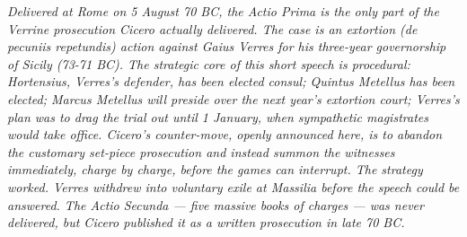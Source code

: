 
\textit{Delivered at Rome on 5 August 70 BC, the Actio Prima is the only
part of the Verrine prosecution Cicero actually delivered. The case is
an extortion (de pecuniis repetundis) action against Gaius Verres for
his three-year governorship of Sicily (73-71 BC). The strategic core of
this short speech is procedural: Hortensius, Verres's defender, has
been elected consul; Quintus Metellus has been elected; Marcus Metellus
will preside over the next year's extortion court; Verres's plan was
to drag the trial out until 1 January, when sympathetic magistrates
would take office. Cicero's counter-move, openly announced here, is to
abandon the customary set-piece prosecution and instead summon the
witnesses immediately, charge by charge, before the games can interrupt.
The strategy worked. Verres withdrew into voluntary exile at Massilia
before the speech could be answered. The Actio Secunda --- five massive
books of charges --- was never delivered, but Cicero published it as a
written prosecution in late 70 BC.}
